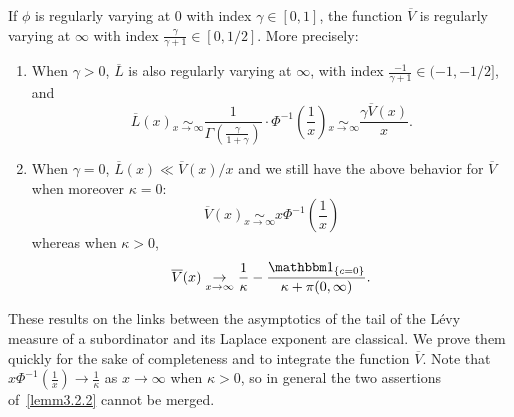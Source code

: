 \documentclass[AHL,Unicode,longabstracts,published]{cedram}
\renewcommand{\bar}[1]{\overline{#1}}
\newcommand*{\relabel}{\renewcommand{\labelenumi}{(\theenumi)}}
\newcommand*{\romanenumi}{\renewcommand*{\theenumi}{\roman{enumi}}\relabel}
\begin{document}
\begin{lemm}\label{lem:varVL}
If $\phi$ is regularly varying at $0$ with index $\gamma \in [0,1]$, the function $\bar V$ is regularly varying at $\infty$ with index $\frac{\gamma}{\gamma+1} \in [0,1/2]$. More precisely:
\begin{enumerate}\romanenumi
\item\label{lemm3.2.1} When $\gamma>0$, $\bar L$ is also regularly varying at $\infty$, with index $\frac{-1}{\gamma+1} \in (-1,-1/2]$, and
\[
\bar L(x) \underset{x \rightarrow \infty}{\sim} \frac{1}{\Gamma\left(\frac{\gamma}{1+\gamma}\right)} \cdot \Phi^{-1}\left(\frac{1}{x}\right) \underset{x \rightarrow \infty}{\sim} \frac{\gamma \bar V(x)}{x}.
\]
\item\label{lemm3.2.2} When $\gamma=0$, $\bar L(x) \ll \bar V(x)/x$ and we still have the above behavior for $\bar V$ when moreover $\kappa=0$:
\[
\bar V(x) \underset{x \rightarrow \infty}{\sim} x \Phi^{-1}\left(\frac{1}{x}\right)
\]
whereas when $\kappa>0$,
\[
\bar V(x) \underset{x \rightarrow \infty}{\rightarrow} \frac{1}{\kappa}- \frac{\mathbbm 1_{\{c=0\}}}{\kappa +\pi(0,\infty)}.
\]
\end{enumerate}
\end{lemm}

These results on the links between the asymptotics of the tail of the Lévy measure of a subordinator and its Laplace exponent are classical. We prove them quickly for the sake of completeness and to integrate the function $\bar V$. Note that $x \Phi^{-1}\left(\frac{1}{x}\right) \rightarrow \frac{1}{\kappa}$ as $x \rightarrow \infty$ when $\kappa>0$, so in general the two assertions of~\eqref{lemm3.2.2} cannot be merged.
\end{document}
